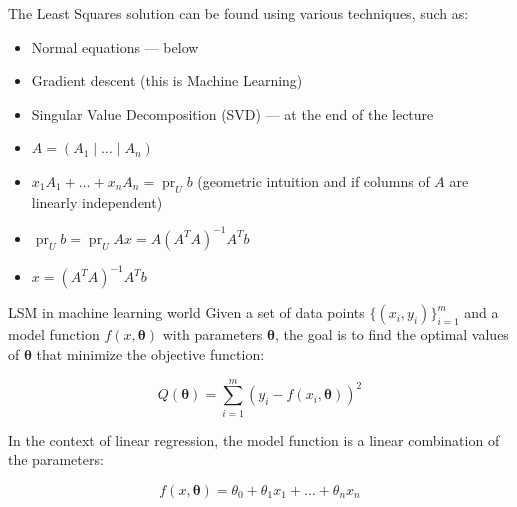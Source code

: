 \documentclass[fullscreen=true, bookmarks=true, hyperref={pdfencoding=unicode}]{beamer}
\begin{document}
\begin{frame}
  The Least Squares solution can be found using various techniques, such as:
  \begin{itemize}
    \pause\item Normal equations — below
    \pause\item Gradient descent (this is Machine Learning)
    \pause\item Singular Value Decomposition (SVD) — at the end of the lecture
  \end{itemize}

  \pause
  \vspace{1cm}
  \begin{itemize}
    \item $A = (A_1 \mid \dots \mid A_n)$
    \item $x_1A_1 + \dots + x_nA_n = \operatorname{pr}_U b$ 
    (geometric intuition and if columns of $A$ are linearly independent)
    \pause
    \item $\operatorname{pr}_U b = \operatorname{pr}_U Ax = A \left(A^TA \right)^{-1}A^Tb$
    \item $x = \left(A^TA \right)^{-1}A^Tb$
  \end{itemize}

\end{frame}


\begin{frame}{LSM in machine learning world}
  \pause
  Given a set of data points $\{(x_i, y_i)\}_{i=1}^{m}$ and 
  a model function $f(x, \boldsymbol{\theta})$ 
  with parameters $\boldsymbol{\theta}$, 
  the goal is to find the optimal values of $\boldsymbol{\theta}$ 
  that minimize the objective function:

  $$Q(\boldsymbol{\theta}) = \sum_{i=1}^{m} (y_i - f(x_i, \boldsymbol{\theta}))^2$$

  \pause
  In the context of linear regression, the model function is a linear combination of the parameters:

  $$f(x, \boldsymbol{\theta}) = \theta_0 + \theta_1 x_1 + \dots + \theta_n x_n$$
\end{frame}
\end{document}

